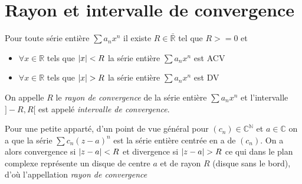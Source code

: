 \documentclass[11pt,colorlinks]{book}
\theoremstyle{mytheoremstyle}
\theoremstyle{mytheoremstyle}
\theoremstyle{mytheoremstyle}
\theoremstyle{mytheoremstyle}
\theoremstyle{mytheoremstyle}
\theoremstyle{mytheoremstyle}
\theoremstyle{mytheoremstyle}
\theoremstyle{mytheoremstyle}
\theoremstyle{myproblemstyle}
\def\mbb#1{\mathbb{#1}}
\def\bN{\mbb{N}}
\def\bC{\mbb{C}}
\def\bR{\mbb{R}}
\begin{document}
\section{Rayon et intervalle de convergence}
\begin{definition}
  Pour toute série entière $\sum a_n x^n$ il existe $R \in \bar{\bR}$ tel que $R >= 0$ et 
  \begin{itemize}
    \item $\forall x \in \bR$ tels que $\abs{x} < R$ la série entière $\sum a_n x^n$ est ACV
    \item $\forall x \in \bR$ tels que $\abs{x} > R$ la série entière $\sum a_n x^n$ est DV
  \end{itemize}
  On appelle $R$ le \textit{rayon de convergence} de la série entière $\sum a_n x^n$ et l'intervalle $]-R,R[$ est appelé \textit{intervalle de convergence}.
\end{definition}
\begin{rmq}
  Pour une petite apparté, d'un point de vue général pour $(c_n) \in \bC^{\bN}$ et $a \in \bC$ on a que la série $\sum c_n (z-a)^n$ est la série 
  entière centrée en a de $(c_n)$. On a alors convergence si $\abs{z - a} < R$ et divergence si $\abs{z - a} > R$ ce qui dans le plan complexe représente 
  un disque de centre $a$ et de rayon $R$ (disque sans le bord), d'où l'appellation \textit{rayon de convergence}
\end{rmq}
\end{document}
